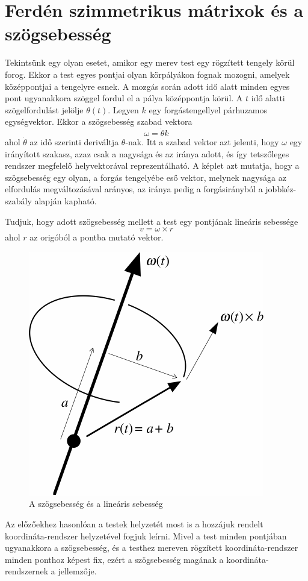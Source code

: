 \documentclass[12pt,a4paper]{report}
\theoremstyle{remark}
\theoremstyle{definition}
\begin{document}
\section{Ferdén szimmetrikus mátrixok és a szögsebesség}
Tekintsünk egy olyan esetet, amikor egy merev test egy rögzített tengely körül forog. Ekkor a test egyes pontjai 
olyan körpályákon fognak mozogni, amelyek középpontjai a tengelyre esnek. A mozgás során adott idő alatt minden 
egyes pont ugyanakkora szöggel fordul el a pálya középpontja körül. A $t$ idő alatti szögelfordulást jelölje 
$\theta(t)$. Legyen $k$ egy forgástengellyel párhuzamos egységvektor. Ekkor a szögsebesség szabad vektora
\begin{equation}
\omega = \dot{\theta}k
\end{equation}
ahol $\dot{\theta}$ az idő szerinti deriváltja $\theta$-nak. Itt a szabad vektor azt jelenti, hogy $\omega$ egy 
irányított szakasz, azaz csak a nagysága és az iránya adott, és így tetszőleges rendszer megfelelő helyvektorával 
reprezentálható. A képlet azt mutatja, hogy a szögsebesség egy olyan, a forgás tengelyébe eső vektor, melynek 
nagysága az elfordulás megváltozásával arányos, az iránya pedig a forgásirányból a jobbkéz-szabály alapján kapható.

Tudjuk, hogy adott szögsebesség mellett a test egy pontjának lineáris sebessége
\begin{equation}
v = \omega \times r
\end{equation}
ahol $r$ az origóból a pontba mutató vektor.

\begin{figure}[h]
\centering
\includegraphics[width=0.5\linewidth]{./images/Angular_velocity}
\caption{A szögsebesség és a lineáris sebesség}
\end{figure}

Az előzőekhez hasonlóan a testek helyzetét most is a hozzájuk rendelt koordináta-rendszer helyzetével fogjuk 
leírni. Mivel a test minden pontjában ugyanakkora a szögsebesség, és a testhez mereven rögzített koordináta-rendszer 
minden ponthoz képest fix, ezért a szögsebesség magának a koordináta-rendszernek a jellemzője.
\end{document}
